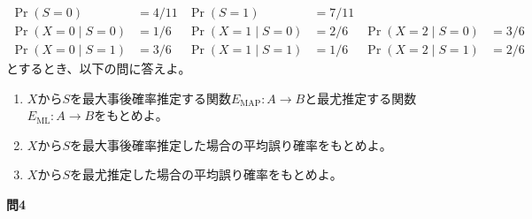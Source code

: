 \documentclass[lualatex,ja=standard,a4paper]{bxjsarticle}
\theoremstyle{definition}
\theoremstyle{remark}
\begin{document}
\begin{align*}
\Pr(S = 0) &= 4/11&
\Pr(S = 1) &= 7/11\\
\Pr(X=0\mid S=0) &= 1/6&
\Pr(X=1\mid S=0) &= 2/6&
\Pr(X=2\mid S=0) &= 3/6\\
\Pr(X=0\mid S=1) &= 3/6&
\Pr(X=1\mid S=1) &= 1/6&
\Pr(X=2\mid S=1) &= 2/6
\end{align*}
とするとき、以下の問に答えよ。
\vspace{1em}
\begin{enumerate}[label=(\arabic*)]
\setlength{\itemsep}{1em}
\item $X$から$S$を最大事後確率推定する関数$E_{\mathrm{MAP}}\colon A\to B$と最尤推定する関数$E_{\mathrm{ML}}\colon A\to B$をもとめよ。
\item $X$から$S$を最大事後確率推定した場合の平均誤り確率をもとめよ。
\item $X$から$S$を最尤推定した場合の平均誤り確率をもとめよ。
\end{enumerate}


\vspace{1em}
{\noindent\large\bfseries 問4}
\end{document}
